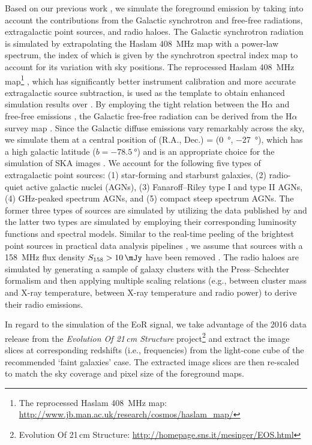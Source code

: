 \documentclass[fleqn,usenatbib]{mnras}
\begin{document}
Based on our previous work \citep{wang2010}, we simulate the foreground
emission by taking into account the contributions from the Galactic
synchrotron and free-free radiations, extragalactic point sources, and
radio haloes.
The Galactic synchrotron radiation is simulated by extrapolating the Haslam
\SI{408}{\MHz} map with a power-law spectrum, the index of which is given
by the synchrotron spectral index map \citep{giardino2002} to account for
its variation with sky positions.
The reprocessed Haslam \SI{408}{\MHz} map\footnote{%
  The reprocessed Haslam \SI{408}{\MHz} map:
  \url{http://www.jb.man.ac.uk/research/cosmos/haslam_map/}}
\citep{remazeilles2015}, which has significantly better instrument
calibration and more accurate extragalactic source subtraction,
is used as the template to obtain enhanced simulation results over
\citet{wang2010}.
By employing the tight relation between the H$\alpha$ and free-free
emissions \citep[see][and references therein]{dickinson2003}, the Galactic
free-free radiation can be derived from the H$\alpha$ survey map
\citep{finkbeiner2003}.
Since the Galactic diffuse emissions vary remarkably across the sky, we
simulate them at a central position of (R.A., Dec\@.) = (\SI{0}{\degree},
\SI{-27}{\degree}), which has a high galactic latitude
($b = \SI{-78.5}{\degree}$) and is an appropriate choice for the simulation
of SKA images \citep[e.g.,][]{beardsley2016}.
We account for the following five types of extragalactic point sources:
(1) star-forming and starburst galaxies, (2) radio-quiet active galactic
nuclei (AGNs), (3) Fanaroff--Riley type I and type II AGNs, (4) GHz-peaked
spectrum AGNs, and (5) compact steep spectrum AGNs.
The former three types of sources are simulated by utilizing the data
published by \citet{wilman2008} and the latter two types are simulated by
employing their corresponding luminosity functions and spectral models.
Similar to the real-time peeling of the brightest point sources in
practical data analysis pipelines \citep[e.g.,][]{mitchell2008,intema2009},
we assume that sources with a \SI{158}{\MHz} flux density
$S_{158} > \SI{10}{\mJy}$ have been removed \citep[e.g.,][]{liu2009ps}.
The radio haloes are simulated by generating a sample of galaxy clusters
with the Press--Schechter formalism \citep{press1974} and then applying
multiple scaling relations (e.g., between cluster mass and X-ray
temperature, between X-ray temperature and radio power) to derive their
radio emissions.

In regard to the simulation of the EoR signal, we take advantage of the
2016 data release from the
\textit{Evolution Of 21\,cm Structure} project\footnote{%
  Evolution Of 21\,cm Structure:
  \url{http://homepage.sns.it/mesinger/EOS.html}}
\citep{mesinger2016} and extract the image slices at corresponding
redshifts (i.e., frequencies) from the light-cone cube of the recommended
`faint galaxies' case.
The extracted image slices are then re-scaled to match the sky coverage and
pixel size of the foreground maps.
\end{document}

